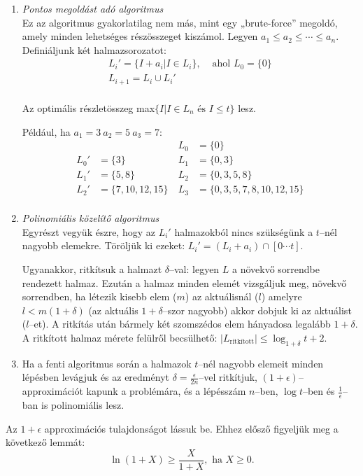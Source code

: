 \begin{enumerate}
  \item \emph{Pontos megoldást adó algoritmus}\\
Ez az algoritmus gyakorlatilag nem más, mint egy „brute-force” megoldó, amely
minden lehetséges részösszeget kiszámol. Legyen $a_1 \leq a_2 \leq \cdots \leq
a_n$. Definiáljunk két halmazsorozatot:
\begin{align*}
L_i' = \{ I + a_i | I \in L_i\}, & \mbox{ ahol } L_0 = \{ 0\} \\
L_{i+1}=L_i \cup L_i' & \\
\end{align*}

Az optimális részletösszeg max$\{I|I \in L_n \mbox{ és } I \leq t\}$ lesz.

Például, ha $a_1=3~a_2=5~a_3=7$:
{
\begin{align*}
    &&~L_0 &= \{ 0 \} \\
L_0'&= \{ 3 \} &~ L_1 &= \{ 0, 3\} \\
L_1'&= \{ 5,8 \} &~ L_2 &= \{ 0, 3, 5, 8\} \\
L_2'&= \{ 7, 10, 12, 15 \} &~ L_3 &= \{ 0, 3, 5, 7, 8, 10, 12, 15\} \\
\end{align*}}
  \item \emph{Polinomiális közelítő algoritmus} \\
  Egyrészt vegyük észre, hogy az $L_i'$ halmazokból nincs szükségünk a $t$--nél
  nagyobb elemekre. Töröljük ki ezeket: $L_i' = (L_i+a_i) \cap [0 \cdots t]$.

  Ugyanakkor, ritkítsuk a halmazt $\delta$--val: legyen $L$ a növekvő sorrendbe
  rendezett halmaz. Ezután a halmaz minden elemét vizsgáljuk meg, növekvő
  sorrendben, ha létezik kisebb elem ($m$) az aktuálisnál ($l$) amelyre
  $l<m(1+\delta)$ (az aktuális $1+\delta$--szor nagyobb) akkor dobjuk ki az
  aktuálist ($l$--et). A ritkítás után bármely két szomszédos elem hányadosa
  legalább $1+\delta$. A ritkított halmaz mérete felülről becsülhető:
  $|L_{\mbox{ritkított}}| \leq \log_{1+\delta}{t+2}$.
  \item Ha a fenti algoritmus során a halmazok $t$--nél nagyobb elemeit minden
  lépésben levágjuk és az eredményt $\delta = \frac{\epsilon}{2n}$--vel
  ritkítjuk, $(1+\epsilon)$--approximációt kapunk a problémára, és a lépésszám
  $n$--ben, $\log t$--ben és $\frac{1}{\epsilon}$--ban is polinomiális lesz.
\end{enumerate}

Az $1+\epsilon$ approximációs tulajdonságot lássuk be. Ehhez elősző figyeljük
meg a következő lemmát:
\[ \ln{(1+X)} \geq \frac{X}{1+X}, \mbox{ ha } X \geq 0.\]

